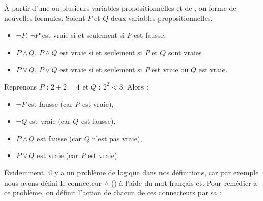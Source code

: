 \documentclass[11pt,class=report,crop=false]{standalone}
\begin{document}
À partir d'une ou plusieurs variables propositionnelles et de , on forme de nouvelles formules.
Soient $P$ et $Q$ deux variables propositionnelles.

\begin{itemize}
	\item {} $\lnot P$. \quad $\lnot P$ est vraie si et seulement si $P$ est fausse.
    
	\item {} $P \land Q$. \quad  $P \land Q$ est vraie si et seulement si $P$ et $Q$ sont vraies.
    
	\item {} $P \lor Q$. \quad $P \lor Q$ est vraie si et seulement si $P$ est vraie ou $Q$ est vraie.
\end{itemize}



Reprenons $P$ : \og{}$2+2 = 4$\fg{} et $Q$ : \og{}$2^2 < 3$\fg{}.
Alors : 
\begin{itemize}
	\item $\lnot P$ est fausse (car $P$ est vraie),
	\item $\lnot Q$ est vraie (car $Q$ est fausse),	
	\item $P \land Q$ est fausse (car $Q$ n'est pas vraie),
	\item $P \lor Q$ est vraie (car $P$ est vraie).
\end{itemize}

Évidemment, il y a un problème de logique dans nos définitions, car par exemple nous avons défini le connecteur \og{}$\land$ \fg{} (\tand) à l'aide du mot français \og{}et\fg{}. Pour remédier à ce problème, on définit l'action de chacun de ces connecteurs par sa  :
\end{document}
